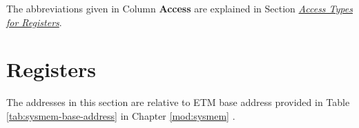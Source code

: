 \documentclass[main\_\_EN.tex]{subfiles}
\begin{document}
The abbreviations given in Column \textbf{Access} are explained in Section \hyperref[glossary-access-types]{\textit{Access Types for Registers}}.






\clearpage
\section{Registers}

The addresses in this section are relative to ETM base address provided in Table \ref{tab:sysmem-base-address} in Chapter \ref{mod:sysmem} \textit{}.


\end{document}
